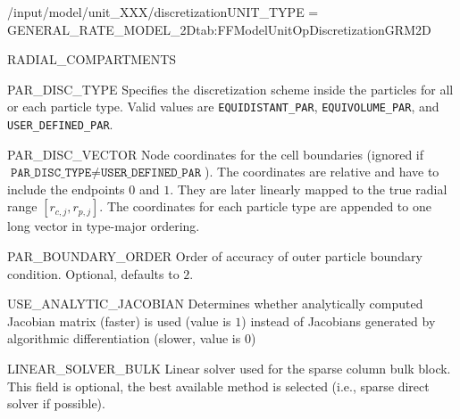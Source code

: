 \begin{condsubgroup}{/input/model/unit\_XXX/discretization}{UNIT\_TYPE = GENERAL\_RATE\_MODEL\_2D}{tab:FFModelUnitOpDiscretizationGRM2D}
\begin{dataset}[unit=\si{\metre},type=double,range={$[0,\texttt{COLUMN\_RADIUS}]$},length={$\texttt{NRAD} + 1$}]{RADIAL\_COMPARTMENTS}
  \end{dataset}
  \begin{dataset}[type=string,length={$1$ / \texttt{NPARTYPE}}]{PAR\_DISC\_TYPE}
    Specifies the discretization scheme inside the particles for all or each particle type.
    Valid values are \texttt{EQUIDISTANT\_PAR}, \texttt{EQUIVOLUME\_PAR}, and \texttt{USER\_DEFINED\_PAR}.
  \end{dataset}
  \begin{dataset}[unit=--,type=double,range={$[0,1]$},length={$\sum_i (\texttt{NPAR}_i + 1)$}]{PAR\_DISC\_VECTOR}
    Node coordinates for the cell boundaries (ignored if $\texttt{PAR\_DISC\_TYPE} \neq \texttt{USER\_DEFINED\_PAR}$).
    The coordinates are relative and have to include the endpoints $0$ and $1$.
    They are later linearly mapped to the true radial range $[r_{c,j}, r_{p,j}]$.
    The coordinates for each particle type are appended to one long vector in type-major ordering.
  \end{dataset}
  \begin{dataset}[type=int,range={$\{ 1,2 \}$},length={1}]{PAR\_BOUNDARY\_ORDER}
    Order of accuracy of outer particle boundary condition.
    Optional, defaults to $2$.
  \end{dataset}
  \begin{dataset}[type=int,range={$\{0, 1\}$},length=1]{USE\_ANALYTIC\_JACOBIAN}
    Determines whether analytically computed Jacobian matrix (faster) is used (value is $1$) instead of Jacobians generated by algorithmic differentiation (slower, value is $0$)
  \end{dataset}
  \begin{dataset}[type=string,range={$\{\texttt{DENSE},\texttt{UMFPACK},\texttt{SUPERLU}\}$},length={1}]{LINEAR\_SOLVER\_BULK}
    Linear solver used for the sparse column bulk block.
    This field is optional, the best available method is selected (i.e., sparse direct solver if possible).


\end{dataset}
\end{condsubgroup}
